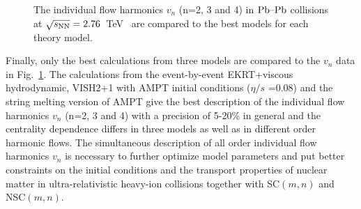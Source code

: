 \begin{figure}[h]
\begin{center}
        \caption{The individual flow harmonics $v_n$ (n=2, 3 and 4) in $\textnormal{Pb--Pb}$ collisions at $\sqrt{s_{\textnormal{NN}}}=2.76$~TeV~\cite{Adam:2016izf} are compared to the best models for each theory model.}
        \label{fig:Figure_11}
              \end{center}
\end{figure}

Finally, only the best calculations from three models are compared to the $v_n$ data in Fig.~\ref{fig:Figure_11}.
The calculations from the event-by-event EKRT+viscous hydrodynamic, VISH2+1 with AMPT initial conditions ($\eta/s$ =0.08) and the string melting version of AMPT give the best description of the individual flow harmonics $v_n$ (n=2, 3 and 4) with a precision of 5-20\% in general and the centrality dependence differs in three models as well as in different order harmonic flows.
The simultaneous description of all order individual flow harmonics $v_n$ is necessary to further optimize model parameters and put better constraints on the initial conditions and the transport properties of nuclear matter in ultra-relativistic heavy-ion collisions together with SC$(m,n)$ and NSC$(m,n)$.
